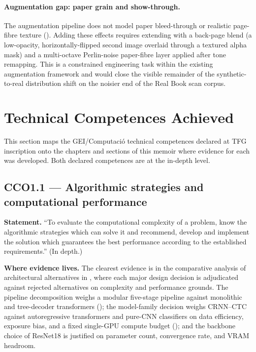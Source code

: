 \paragraph{Augmentation gap: paper grain and show-through.}
The augmentation pipeline does not model paper bleed-through or
realistic page-fibre texture ().
Adding these effects requires extending 
with a back-page blend (a low-opacity, horizontally-flipped second
image overlaid through a textured alpha mask) and a multi-octave
Perlin-noise paper-fibre layer applied after tone remapping.
This is a constrained engineering task within the existing
augmentation framework and would close the visible remainder of the
synthetic-to-real distribution shift on the noisier end of the
Real Book scan corpus.

\section{Technical Competences Achieved}
\label{sec:conc-competences}

This section maps the GEI/Computació technical competences declared at
TFG inscription onto the chapters and sections of this memoir where
evidence for each was developed.
Both declared competences are at the in-depth level.

\subsection{CCO1.1 — Algorithmic strategies and computational
performance}

\textbf{Statement.}
``To evaluate the computational complexity of a problem, know the
algorithmic strategies which can solve it and recommend, develop and
implement the solution which guarantees the best performance according
to the established requirements.'' (In depth.)

\textbf{Where evidence lives.}
The clearest evidence is in the comparative analysis of architectural
alternatives in , where each major design decision is
adjudicated against rejected alternatives on complexity and
performance grounds. The pipeline decomposition weighs a modular
five-stage pipeline against monolithic and tree-decoder transformers
(); the
model-family decision weighs CRNN--CTC against autoregressive
transformers and pure-CNN classifiers on data efficiency, exposure
bias, and a fixed single-GPU compute budget
(); and the backbone
choice of ResNet18 is justified on parameter count, convergence rate,
and VRAM headroom.


